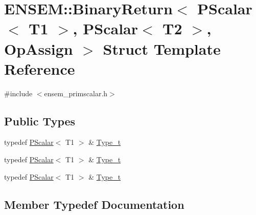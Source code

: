 \hypertarget{structENSEM_1_1BinaryReturn_3_01PScalar_3_01T1_01_4_00_01PScalar_3_01T2_01_4_00_01OpAssign_01_4}{}\section{E\+N\+S\+EM\+:\+:Binary\+Return$<$ P\+Scalar$<$ T1 $>$, P\+Scalar$<$ T2 $>$, Op\+Assign $>$ Struct Template Reference}
\label{structENSEM_1_1BinaryReturn_3_01PScalar_3_01T1_01_4_00_01PScalar_3_01T2_01_4_00_01OpAssign_01_4}


{\ttfamily \#include $<$ensem\+\_\+primscalar.\+h$>$}

\subsection*{Public Types}
\begin{DoxyCompactItemize}
\item 
typedef \mbox{\hyperlink{classENSEM_1_1PScalar}{P\+Scalar}}$<$ T1 $>$ \& \mbox{\hyperlink{structENSEM_1_1BinaryReturn_3_01PScalar_3_01T1_01_4_00_01PScalar_3_01T2_01_4_00_01OpAssign_01_4_a3b0f260465f0e45413e2c6179d6cb397}{Type\+\_\+t}}
\item 
typedef \mbox{\hyperlink{classENSEM_1_1PScalar}{P\+Scalar}}$<$ T1 $>$ \& \mbox{\hyperlink{structENSEM_1_1BinaryReturn_3_01PScalar_3_01T1_01_4_00_01PScalar_3_01T2_01_4_00_01OpAssign_01_4_a3b0f260465f0e45413e2c6179d6cb397}{Type\+\_\+t}}
\item 
typedef \mbox{\hyperlink{classENSEM_1_1PScalar}{P\+Scalar}}$<$ T1 $>$ \& \mbox{\hyperlink{structENSEM_1_1BinaryReturn_3_01PScalar_3_01T1_01_4_00_01PScalar_3_01T2_01_4_00_01OpAssign_01_4_a3b0f260465f0e45413e2c6179d6cb397}{Type\+\_\+t}}
\end{DoxyCompactItemize}


\subsection{Member Typedef Documentation}
\mbox{\label{structENSEM_1_1BinaryReturn_3_01PScalar_3_01T1_01_4_00_01PScalar_3_01T2_01_4_00_01OpAssign_01_4_a3b0f260465f0e45413e2c6179d6cb397}} 
